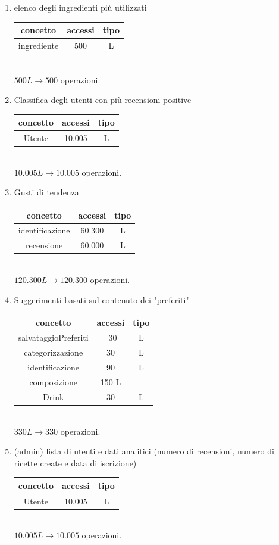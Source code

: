 \documentclass[a4paper,12pt]{report}
\begin{document}
\begin{enumerate}
    \item elenco degli ingredienti più utilizzati\\
    \begin{tabular}{c|c|c}
    concetto & accessi & tipo\\
    \hline
        ingrediente & 500 & L\\
    \hline
    \end{tabular}
    \\ $500L\to500$ operazioni.

    \item Classifica degli utenti con più recensioni positive\\
    \begin{tabular}{c|c|c}
    concetto & accessi & tipo\\
    \hline
        Utente & 10.005 & L\\
    \hline
    \end{tabular}
    \\ $ 10.005L\to 10.005$ operazioni.

    \item Gusti di tendenza\\
    \begin{tabular}{c|c|c}
    concetto & accessi & tipo\\
    \hline
        identificazione & 60.300 & L\\
        recensione & 60.000 & L\\
    \hline
    \end{tabular}
    \\ $120.300L\to120.300$ operazioni.

    \item Suggerimenti basati sul contenuto dei "preferiti"\\
    \begin{tabular}{c|c|c}
    concetto & accessi & tipo\\
    \hline
        salvataggioPreferiti & ~30 & L\\
        categorizzazione & 30 & L\\
        identificazione & 90 & L\\
        composizione & 150 L\\
        Drink & 30 & L\\
    \hline
    \end{tabular}
    \\ $330L\to330$ operazioni.

    \item \normalsize(admin) lista di utenti e dati analitici \footnotesize (numero di recensioni, numero di ricette create e data di iscrizione)\normalsize\\
    \begin{tabular}{c|c|c}
    concetto & accessi & tipo\\
    \hline
        Utente & 10.005 & L\\
    \hline
    \end{tabular}
    \\ $10.005L\to10.005$ operazioni.


\end{enumerate}
\end{document}
